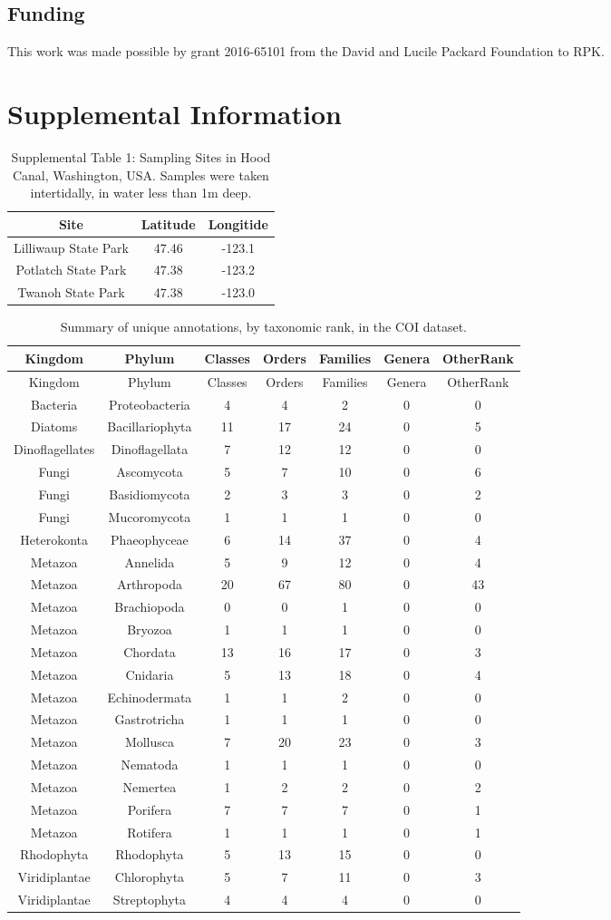 \documentclass[fleqn,10pt,lineno]{wlpeerj} %
\begin{document}
\subsection{Funding}\label{funding}

This work was made possible by grant 2016-65101 from the David and
Lucile Packard Foundation to RPK.

\section{Supplemental Information}\label{supplemental-information}

\begin{table}

\caption{\label{tab:Supplement_GPScoordinatesSamplingAreas}Supplemental Table 1: Sampling Sites in Hood Canal, Washington, USA. Samples were taken intertidally, in water less than 1m deep.}
\centering
\begin{tabular}[t]{c|c|c}
\hline
Site & Latitude & Longitide\\
\hline
Lilliwaup State Park & 47.46 & -123.1\\
\hline
Potlatch State Park & 47.38 & -123.2\\
\hline
Twanoh State Park & 47.38 & -123.0\\
\hline
\end{tabular}
\end{table}

\begin{longtable}[]{@{}ccccccc@{}}
\caption{Summary of unique annotations, by taxonomic rank, in the COI
dataset.}\tabularnewline
\toprule
Kingdom & Phylum & Classes & Orders & Families & Genera &
OtherRank\tabularnewline
\midrule
\endfirsthead
\toprule
Kingdom & Phylum & Classes & Orders & Families & Genera &
OtherRank\tabularnewline
\midrule
\endhead
Bacteria & Proteobacteria & 4 & 4 & 2 & 0 & 0\tabularnewline
Diatoms & Bacillariophyta & 11 & 17 & 24 & 0 & 5\tabularnewline
Dinoflagellates & Dinoflagellata & 7 & 12 & 12 & 0 & 0\tabularnewline
Fungi & Ascomycota & 5 & 7 & 10 & 0 & 6\tabularnewline
Fungi & Basidiomycota & 2 & 3 & 3 & 0 & 2\tabularnewline
Fungi & Mucoromycota & 1 & 1 & 1 & 0 & 0\tabularnewline
Heterokonta & Phaeophyceae & 6 & 14 & 37 & 0 & 4\tabularnewline
Metazoa & Annelida & 5 & 9 & 12 & 0 & 4\tabularnewline
Metazoa & Arthropoda & 20 & 67 & 80 & 0 & 43\tabularnewline
Metazoa & Brachiopoda & 0 & 0 & 1 & 0 & 0\tabularnewline
Metazoa & Bryozoa & 1 & 1 & 1 & 0 & 0\tabularnewline
Metazoa & Chordata & 13 & 16 & 17 & 0 & 3\tabularnewline
Metazoa & Cnidaria & 5 & 13 & 18 & 0 & 4\tabularnewline
Metazoa & Echinodermata & 1 & 1 & 2 & 0 & 0\tabularnewline
Metazoa & Gastrotricha & 1 & 1 & 1 & 0 & 0\tabularnewline
Metazoa & Mollusca & 7 & 20 & 23 & 0 & 3\tabularnewline
Metazoa & Nematoda & 1 & 1 & 1 & 0 & 0\tabularnewline
Metazoa & Nemertea & 1 & 2 & 2 & 0 & 2\tabularnewline
Metazoa & Porifera & 7 & 7 & 7 & 0 & 1\tabularnewline
Metazoa & Rotifera & 1 & 1 & 1 & 0 & 1\tabularnewline
Rhodophyta & Rhodophyta & 5 & 13 & 15 & 0 & 0\tabularnewline
Viridiplantae & Chlorophyta & 5 & 7 & 11 & 0 & 3\tabularnewline
Viridiplantae & Streptophyta & 4 & 4 & 4 & 0 & 0\tabularnewline
\bottomrule
\end{longtable}
\end{document}
